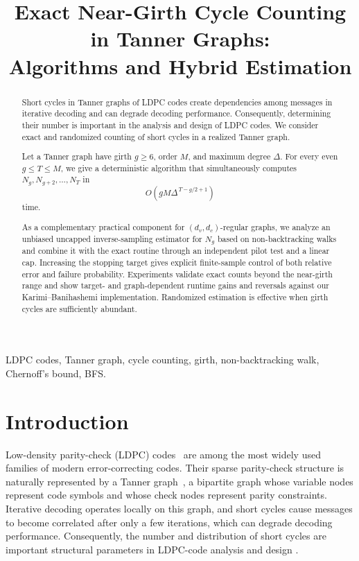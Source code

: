 \documentclass[conference]{IEEEtran}
\begin{document}
\title{Exact Near-Girth Cycle Counting in Tanner Graphs:\\
Algorithms and Hybrid Estimation}

\author{
}

\maketitle

\begin{abstract}
Short cycles in Tanner graphs of LDPC codes create dependencies among messages in iterative
decoding and can degrade decoding performance. Consequently, determining
their number is important in the analysis and design of LDPC codes. We consider exact and randomized counting of short cycles in a realized Tanner
graph.

Let a Tanner graph have girth $g\ge6$, order $M$, and maximum degree $\Delta$.
For every even $g\le T\le M$, we give a deterministic algorithm that
simultaneously computes $N_g,N_{g+2},\ldots,N_T$ in
\[
O\!\left(gM\Delta^{\,T-g/2+1}\right)
\]
time.

As a complementary practical component for $(d_v,d_c)$-regular graphs, we
analyze an unbiased uncapped inverse-sampling estimator for $N_g$ based on
non-backtracking walks and combine it with the exact routine through an
independent pilot test and a linear cap. Increasing the stopping target gives
explicit finite-sample control of both relative error and failure probability.
Experiments validate exact counts beyond the near-girth range and show
target- and graph-dependent runtime gains and reversals against our
Karimi--Banihashemi implementation. Randomized estimation is effective
when girth cycles are sufficiently abundant.
\end{abstract}

\begin{IEEEkeywords}
LDPC codes, Tanner graph, cycle counting, girth, non-backtracking walk, Chernoff's bound, BFS.
\end{IEEEkeywords}

\section{Introduction}
Low-density parity-check (LDPC) codes~\cite{gallager1962} are among the most
widely used families of modern error-correcting codes. Their sparse
parity-check structure is naturally represented by a Tanner
graph~\cite{tanner1981},
a bipartite graph whose variable nodes represent code symbols and whose check
nodes represent parity constraints. Iterative decoding operates locally on
this graph, and short cycles cause messages to become correlated after only a
few iterations, which can degrade decoding performance. Consequently, the
number and distribution of short cycles are important
structural parameters in LDPC-code analysis and design
\cite{halford2006,karimi2013,blake2018,dehghan2019}.
\end{document}
